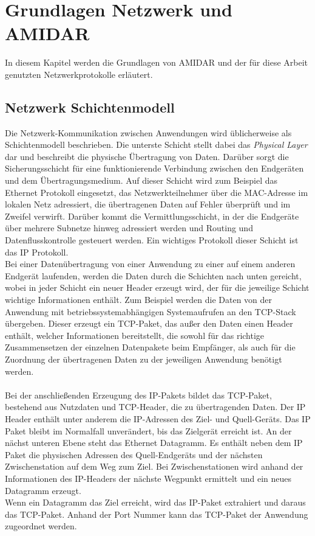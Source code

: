 \chapter{Grundlagen Netzwerk und AMIDAR}
In diesem Kapitel werden die Grundlagen von AMIDAR und der für diese Arbeit genutzten Netzwerkprotokolle erläutert. 

\section{Netzwerk Schichtenmodell}
Die Netzwerk-Kommunikation zwischen Anwendungen wird üblicherweise als Schichtenmodell beschrieben.  
Die unterste Schicht stellt dabei das \textit{Physical Layer} dar und beschreibt die physische Übertragung von Daten. 
Darüber sorgt die Sicherungsschicht für eine funktionierende Verbindung zwischen den Endgeräten und dem Übertragungsmedium. Auf dieser Schicht wird zum Beispiel das Ethernet Protokoll eingesetzt, das Netzwerkteilnehmer über die MAC-Adresse im lokalen Netz adressiert, die übertragenen Daten auf Fehler überprüft und im Zweifel verwirft. 
Darüber kommt die Vermittlungsschicht, in der die Endgeräte über mehrere Subnetze hinweg adressiert werden und Routing und Datenflusskontrolle gesteuert werden. Ein wichtiges Protokoll dieser Schicht ist das IP Protokoll. \\
Bei einer Datenübertragung von einer Anwendung zu einer auf einem anderen Endgerät laufenden, werden die Daten durch die Schichten nach unten gereicht, wobei in jeder Schicht ein neuer Header erzeugt wird, der für die jeweilige Schicht wichtige Informationen enthält. Zum Beispiel werden die Daten von der Anwendung mit betriebssystemabhängigen Systemaufrufen an den TCP-Stack übergeben. Dieser erzeugt ein TCP-Paket, das außer den Daten einen Header enthält, welcher Informationen bereitstellt, die sowohl für das richtige Zusammensetzen der einzelnen Datenpakete beim Empfänger, als auch für die Zuordnung der übertragenen Daten zu der jeweiligen Anwendung benötigt werden.\\\\
Bei der anschließenden Erzeugung des IP-Pakets bildet das TCP-Paket, bestehend aus Nutzdaten und TCP-Header, die zu übertragenden Daten. Der IP Header enthält unter anderem die IP-Adressen des Ziel- und Quell-Geräts. Das IP Paket bleibt im Normalfall unverändert, bis das Zielgerät erreicht ist. An der nächst unteren Ebene steht das Ethernet Datagramm. Es enthält neben dem IP Paket die physischen Adressen des Quell-Endgeräts und der nächsten Zwischenstation auf dem Weg zum Ziel. Bei Zwischenstationen wird anhand der Informationen des IP-Headers der nächste Wegpunkt ermittelt und ein neues Datagramm erzeugt. \\
Wenn ein Datagramm das Ziel erreicht, wird das IP-Paket extrahiert und daraus das TCP-Paket. Anhand der Port Nummer kann das TCP-Paket der Anwendung zugeordnet werden.\cite{Layer}



